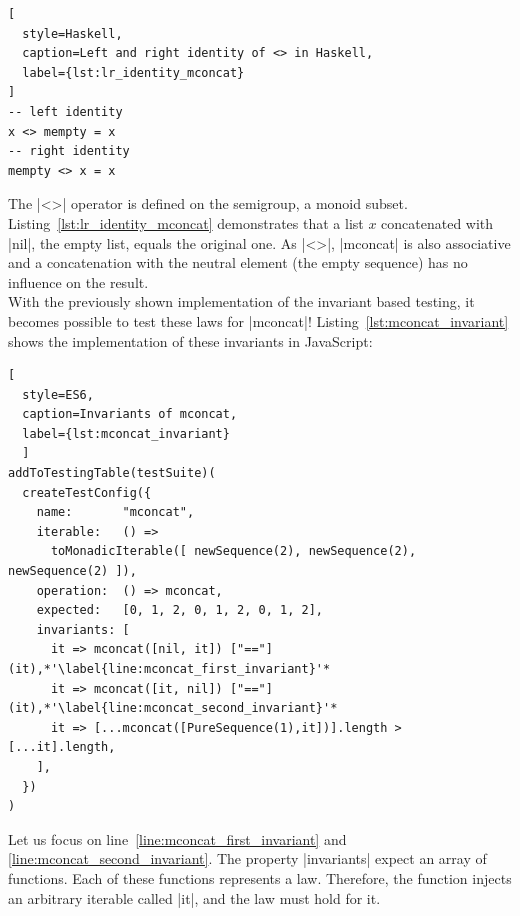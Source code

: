 \begin{lstlisting}[
  style=Haskell,
  caption=Left and right identity of <> in Haskell,
  label={lst:lr_identity_mconcat}
]
-- left identity
x <> mempty = x
-- right identity
mempty <> x = x
\end{lstlisting}

The |<>| operator is defined on the semigroup, a monoid subset.
Listing~\ref{lst:lr_identity_mconcat} demonstrates that a list $x$ concatenated
with |nil|, the empty list, equals the original one. As |<>|, |mconcat| is also
associative and a concatenation with the neutral element (the empty sequence)
has no influence on the result.\\ 
With the previously shown implementation of the invariant based testing, it
becomes possible to test these laws for |mconcat|!
Listing~\ref{lst:mconcat_invariant} shows the implementation of these
invariants in JavaScript:

\begin{lstlisting}[
  style=ES6, 
  caption=Invariants of mconcat,
  label={lst:mconcat_invariant}
  ]
addToTestingTable(testSuite)(
  createTestConfig({
    name:       "mconcat",
    iterable:   () => 
      toMonadicIterable([ newSequence(2), newSequence(2), newSequence(2) ]),
    operation:  () => mconcat,
    expected:   [0, 1, 2, 0, 1, 2, 0, 1, 2],
    invariants: [
      it => mconcat([nil, it]) ["=="] (it),*'\label{line:mconcat_first_invariant}'*
      it => mconcat([it, nil]) ["=="] (it),*'\label{line:mconcat_second_invariant}'*
      it => [...mconcat([PureSequence(1),it])].length > [...it].length,
    ],
  })
)
\end{lstlisting}

Let us focus on line~\ref{line:mconcat_first_invariant} and 
\ref{line:mconcat_second_invariant}.
The property |invariants| expect an array of functions. Each of these
functions represents a law. Therefore, the function injects an arbitrary
iterable called |it|, and the law must hold for it.

